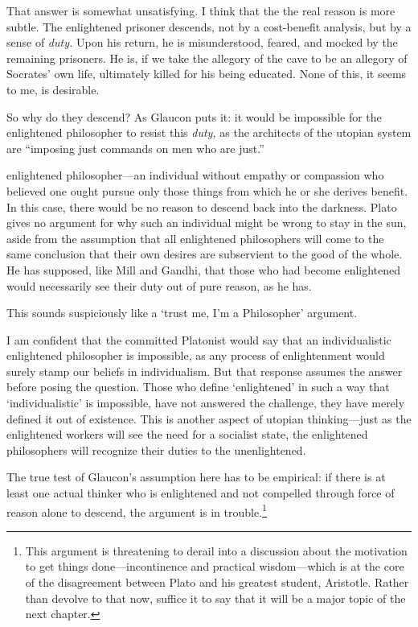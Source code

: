 That answer is somewhat unsatisfying. I think that the the real reason is more subtle. The enlightened prisoner descends, not by a cost-benefit analysis, but by a sense of \emph{duty.} Upon his return, he is misunderstood, feared, and mocked by the remaining prisoners. He is, if we take the allegory of the cave to be an allegory of Socrates' own life, ultimately killed for his being educated. None of this, it seems to me, is desirable. 

So why do they descend? As Glaucon puts it: it would be impossible for the enlightened philosopher to resist this \emph{duty,} as the architects of the utopian system are ``imposing just commands on men who are just.''

 enlightened philosopher---an individual without empathy or compassion who believed one ought pursue only those things from which he or she derives benefit. In this case, there would be no reason to descend back into the darkness. Plato gives no argument for why such an individual might be wrong to stay in the sun, aside from the assumption that all enlightened philosophers will come to the same conclusion that their own desires are subservient to the good of the whole. He has supposed, like Mill and Gandhi, that those who had become enlightened would necessarily see their duty out of pure reason, as he has. 

This sounds suspiciously like a `trust me, I'm a Philosopher' argument.

I am confident that the committed Platonist would say that an individualistic enlightened philosopher is impossible, as any process of enlightenment would surely stamp our beliefs in individualism. But that response assumes the answer before posing the question. Those who define `enlightened' in such a way that `individualistic' is impossible, have not answered the challenge, they have merely defined it out of existence. This is another aspect of utopian thinking---just as the enlightened workers will see the need for a socialist state, the enlightened philosophers will recognize their duties to the unenlightened.

The true test of Glaucon's assumption here has to be empirical: if there is at least one actual thinker who is enlightened and not compelled through force of reason alone to descend, the argument is in trouble.\footnote{This argument is threatening to derail into a discussion about the motivation to get things done---incontinence and practical wisdom---which is at the core of the disagreement between Plato and his greatest student, Aristotle. Rather than devolve to that now, suffice it to say that it will be a major topic of the next chapter.}

